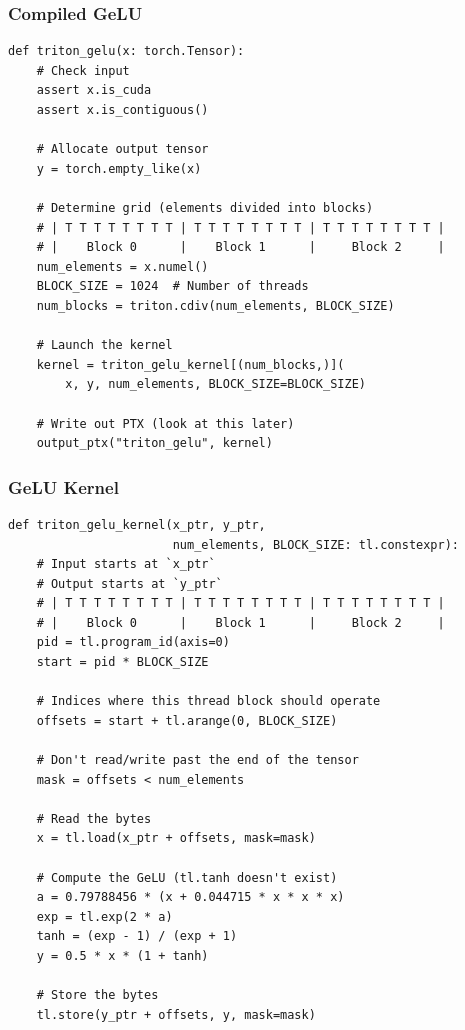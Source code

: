 \documentclass[12pt,twoside]{article}
\begin{document}
\subsubsection*{Compiled GeLU}

\begin{verbatim}
def triton_gelu(x: torch.Tensor):
    # Check input
    assert x.is_cuda
    assert x.is_contiguous()
    
    # Allocate output tensor
    y = torch.empty_like(x)

    # Determine grid (elements divided into blocks)
    # | T T T T T T T T | T T T T T T T T | T T T T T T T T |
    # |    Block 0      |    Block 1      |     Block 2     |
    num_elements = x.numel()  
    BLOCK_SIZE = 1024  # Number of threads
    num_blocks = triton.cdiv(num_elements, BLOCK_SIZE)  
    
    # Launch the kernel
    kernel = triton_gelu_kernel[(num_blocks,)](
        x, y, num_elements, BLOCK_SIZE=BLOCK_SIZE)
    
    # Write out PTX (look at this later)
    output_ptx("triton_gelu", kernel)  
\end{verbatim}

\subsubsection*{GeLU Kernel}

\begin{verbatim}
def triton_gelu_kernel(x_ptr, y_ptr, 
                       num_elements, BLOCK_SIZE: tl.constexpr):
    # Input starts at `x_ptr`
    # Output starts at `y_ptr`
    # | T T T T T T T T | T T T T T T T T | T T T T T T T T |
    # |    Block 0      |    Block 1      |     Block 2     |
    pid = tl.program_id(axis=0)
    start = pid * BLOCK_SIZE
    
    # Indices where this thread block should operate
    offsets = start + tl.arange(0, BLOCK_SIZE)
    
    # Don't read/write past the end of the tensor
    mask = offsets < num_elements
    
    # Read the bytes
    x = tl.load(x_ptr + offsets, mask=mask)
    
    # Compute the GeLU (tl.tanh doesn't exist)
    a = 0.79788456 * (x + 0.044715 * x * x * x)
    exp = tl.exp(2 * a)
    tanh = (exp - 1) / (exp + 1)
    y = 0.5 * x * (1 + tanh)
    
    # Store the bytes
    tl.store(y_ptr + offsets, y, mask=mask)
\end{verbatim}
\end{document}

